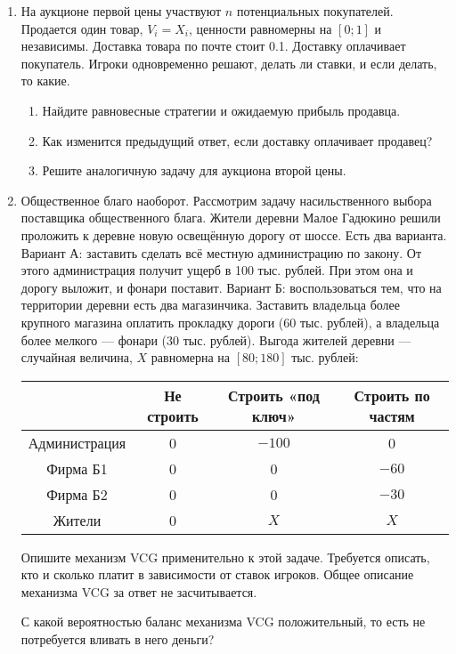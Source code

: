 \begin{enumerate}
\item На аукционе первой цены участвуют $ n $ потенциальных покупателей. Продается один товар, $ V_{i}=X_{i} $, ценности равномерны на $ [0;1] $ и независимы. Доставка товара по почте стоит 0.1. Доставку оплачивает покупатель. Игроки одновременно решают, делать ли ставки, и если делать, то какие.

\begin{enumerate}
\item Найдите равновесные стратегии и ожидаемую прибыль продавца.
\item Как изменится предыдущий ответ, если доставку оплачивает продавец?
\item Решите аналогичную задачу для аукциона второй цены.
\end{enumerate}


\item Общественное благо наоборот. Рассмотрим задачу насильственного выбора поставщика общественного блага. Жители деревни Малое Гадюкино решили проложить к деревне новую освещённую дорогу от шоссе. Есть два варианта. Вариант А: заставить сделать всё местную администрацию по закону. От этого администрация получит ущерб в 100 тыс. рублей. При этом она и дорогу выложит, и фонари поставит. Вариант Б: воспользоваться тем, что на территории деревни есть два магазинчика. Заставить владельца более крупного магазина оплатить прокладку дороги (60 тыс. рублей), а владельца более мелкого — фонари (30 тыс. рублей). Выгода жителей деревни — случайная величина, $ X $ равномерна на $ [80;180] $ тыс. рублей:

\begin{tabular}{c|ccc}
& Не строить & Строить «под ключ» & Строить по частям \\
\hline
Администрация & 0 & $-100$ & 0\\
Фирма Б1 & 0 & 0 & $-60$\\
Фирма Б2 & 0 & 0 & $-30$\\
Жители & 0 & $X$ & $X$\\
\end{tabular}

Опишите механизм VCG применительно к этой задаче. Требуется описать, кто и сколько платит в зависимости от ставок игроков. Общее описание механизма VCG за ответ не засчитывается.

С какой вероятностью баланс механизма VCG положительный, то есть не потребуется вливать в него деньги?



\end{enumerate}

